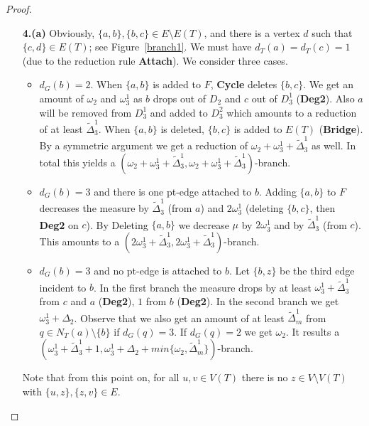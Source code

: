 \documentclass{llncs}
\begin{document}
{\begin{proof}
\begin{enumerate}\itemsep.5pt
 \item[\bf 4.(a)] Obviously, $\{a,b\},\{b,c\} \in E\setminus E(T)$, and there is a vertex $d$ such that $\{c,d\} \in E(T)$; see Figure~\ref{branch1}. We must have $d_T(a)=d_T(c)=1$ (due to the reduction rule {\bf Attach}).
We consider three cases.
\begin{itemize}
\item $d_G(b)=2$. When $\{a,b\}$ is added to $F$, {\bf Cycle} deletes $\{b,c\}$. We get an amount of $\omega_2$ and $\omega_3^1$ as $b$ drops out of $D_2$ and $c$ out of $D_3^1$ ({\bf Deg2}). Also $a$ will be removed from $D_3^1$ and added to $D_3^2$ which amounts to a reduction of at least $\tilde{\Delta}_3^1$. When $\{a,b\}$ is deleted, $\{b,c\}$ is added to $E(T)$ ({\bf Bridge}). By a symmetric argument we get a reduction of $\omega_2+\omega_3^1+\tilde \Delta_3^1$ as well. In total this yields a $(\omega_2+\omega_3^1+\tilde \Delta_3^1,\omega_2+\omega_3^1+\tilde \Delta_3^1)$-branch.
\item $d_G(b)=3$ and there is one  pt-edge attached to $b$. Adding $\{a,b\}$ to $F$ decreases the measure by $\tilde \Delta_3^1$ (from $a$) and $2\omega_3^1$ (deleting $\{b,c\}$, then {\bf Deg2} on $c$). By Deleting $\{a,b\}$  we decrease $\mu$ by $2\omega_3^1$ and by $\tilde \Delta_3^1$ (from $c$).   This amounts to a $(2\omega_3^1+\tilde \Delta_3^1,2\omega_3^1+\tilde \Delta_3^1)$-branch.
\item $d_G(b)=3$ and no pt-edge is attached to $b$. Let $\{b,z\}$ be the third edge incident to $b$. In the first branch the measure drops by at least $\omega_3^1+\tilde \Delta_3^1$ from $c$ and $a$ ({\bf Deg2}), $1$ from $b$ ({\bf Deg2}). 
In the second branch we get $\omega_3^1+\Delta_2$. Observe that we also get an amount of at least $\tilde \Delta_m^1$ from $q \in N_T(a) \setminus \{b\}$ if $d_G(q)=3$. If $d_G(q)=2$ we get $\omega_2$.  It results a $(\omega_3^1+\tilde \Delta_3^1+1,\omega_3^1+\Delta_2+min\{\omega_2,\tilde \Delta_m^1\})$-branch.
\end{itemize}
Note that from this point on, for all $u,v \in V(T)$ there is no $z \in V\setminus V(T)$ with $\{u,z\},\{z,v\}\in E$.\vspace*{2ex}


\end{enumerate}
\end{proof}}
\end{document}
